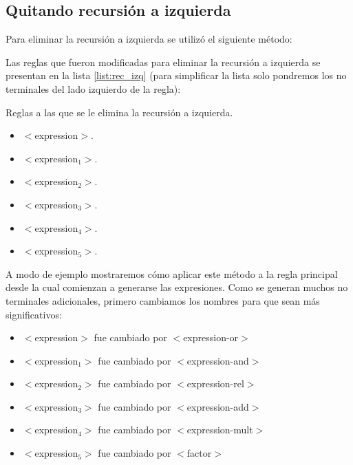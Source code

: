 \subsection{Quitando recursión a izquierda}
Para eliminar la recursión a izquierda se utilizó el siguiente método:

\begin{center}
\end{center}

Las reglas que fueron modificadas para eliminar la recursión a izquierda se presentan en la lista \ref{list:rec_izq} (para simplificar la lista solo pondremos los no terminales del lado izquierdo de la regla):

\begin{mylist}[H]
\caption{Reglas a las que se le elimina la recursión a izquierda.}
\begin{multicols}{3}
\begin{itemize}
\item $<$expression$>$.
\item $<$expression$_1$$>$.
\item $<$expression$_2$$>$.
\item $<$expression$_3$$>$.
\item $<$expression$_4$$>$.
\item $<$expression$_5$$>$.
\end{itemize}
\end{multicols}
\label{list:rec_izq}
\end{mylist}

A modo de ejemplo mostraremos cómo aplicar este método a la regla principal desde la cual comienzan a generarse las expresiones. Como se generan muchos no terminales adicionales, primero cambiamos los nombres para que sean más significativos:
\begin{itemize}
\item $<$expression$>$ fue cambiado por $<$expression-or$>$
\item $<$expression$_1$$>$ fue cambiado por $<$expression-and$>$
\item $<$expression$_2$$>$ fue cambiado por $<$expression-rel$>$
\item $<$expression$_3$$>$ fue cambiado por $<$expression-add$>$
\item $<$expression$_4$$>$ fue cambiado por $<$expression-mult$>$
\item $<$expression$_5$$>$ fue cambiado por $<$factor$>$
\end{itemize}

